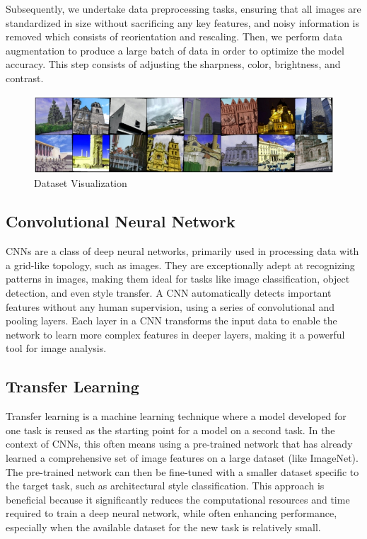 \documentclass{article}
\begin{document}
Subsequently, we undertake data preprocessing tasks, ensuring that all images are standardized in size without sacrificing any key features, and noisy information is removed which consists of reorientation and rescaling. Then, we perform data augmentation to produce a large batch of data in order to optimize the model accuracy. This step consists of adjusting the sharpness, color, brightness, and contrast.

\begin{figure}[h]
    \centering

    \includegraphics[width=0.5\linewidth]{images/Data_Visual.jpg}   
    \caption{Dataset Visualization}
    \label{fig:train_acc}
\end{figure}

\subsection{Convolutional Neural Network}
CNNs are a class of deep neural networks, primarily used in processing data with a grid-like topology, such as images. They are exceptionally adept at recognizing patterns in images, making them ideal for tasks like image classification, object detection, and even style transfer. A CNN automatically detects important features without any human supervision, using a series of convolutional and pooling layers. Each layer in a CNN transforms the input data to enable the network to learn more complex features in deeper layers, making it a powerful tool for image analysis.

\subsection{Transfer Learning}
Transfer learning is a machine learning technique where a model developed for one task is reused as the starting point for a model on a second task. In the context of CNNs, this often means using a pre-trained network that has already learned a comprehensive set of image features on a large dataset (like ImageNet). The pre-trained network can then be fine-tuned with a smaller dataset specific to the target task, such as architectural style classification. This approach is beneficial because it significantly reduces the computational resources and time required to train a deep neural network, while often enhancing performance, especially when the available dataset for the new task is relatively small.
\end{document}
